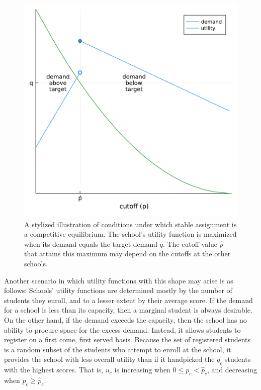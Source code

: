 \documentclass[12pt]{article}
\numberwithin{equation}{subsection}
\theoremstyle{definition}
\begin{document}
\begin{figure}
\begin{center}\includegraphics[width=0.7\linewidth, ]{plots/stylized-utility.pdf}\end{center}
\captionsetup{singlelinecheck=off}
    \caption[.]{A stylized illustration of conditions under which stable assignment is a competitive equilibrium. The school's utility function is maximized when its demand equals the target demand $q$. The cutoff value $\hat p$ that attains this maximum may depend on the cutoffs at the other schools.}
\label{stylized-utility}
\end{figure}

Another scenario in which utility functions with this shape may arise is as follows: Schools' utility functions are determined mostly by the number of students they enroll, and to a lesser extent by their average score. If the demand for a school is less than its capacity, then a marginal student is always desirable. On the other hand, if the demand exceeds the capacity, then the school has no ability to procure space for the excess demand. Instead, it allows students to register on a first come, first served basis. Because the set of registered students is a random subset of the students who attempt to enroll at the school, it provides the school with less overall utility than if it handpicked the $q_c$ students with the highest scores. That is, $u_c$ is increasing when $0 \leq p_c < \hat p_c$, and decreasing when $p_c \geq \hat p_c$. 
\end{document}
